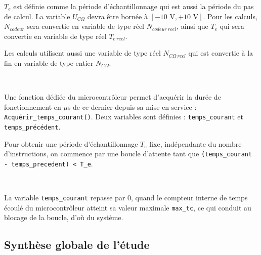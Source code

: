 $T_e$ est définie comme la période d'échantillonnage qui est aussi la période du pas de calcul. La variable $U_{C\Omega}$ devra être bornée à $[-10 \text{ V}, +10 \text{ V}]$. Pour les calculs, $N_{codeur}$ sera convertie en variable de type réel $N_{codeur\ reel}$, ainsi que $T_e$ qui sera convertie en variable de type réel $T_{e\ reel}$.

Les calculs utilisent aussi une variable de type réel $N_{C\Omega\ reel}$ qui est convertie à la fin en variable de type entier $N_{C\Omega}$.


~\

Une fonction dédiée du microcontrôleur permet d'acquérir la durée de fonctionnement en $\mu$s de ce dernier depuis sa mise en service : \texttt{Acquérir\_temps\_courant()}. Deux variables sont définies : \texttt{temps\_courant} et \texttt{temps\_précédent}.

Pour obtenir une période d'échantillonnage $T_e$ fixe, indépendante du nombre d'instructions, on commence par une boucle d'attente tant que \texttt{(temps\_courant - temps\_precedent) < T\_e}.


~\

La variable \texttt{temps\_courant} repasse par 0, quand le compteur interne de temps écoulé du microcontrôleur atteint sa valeur maximale \texttt{max\_tc}, ce qui conduit au blocage de la boucle, d'où du système.


\subsection{Synthèse globale de l'étude}


\newpage

